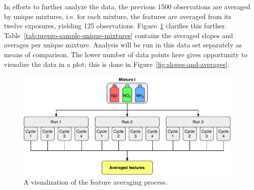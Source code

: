 In efforts to further analyze the data, the previous 1500 observations are averaged by unique mixtures, i.e. for each mixture, the features are averaged from its twelve exposures, yielding 125 observations. Figure~\ref{fig:averaging-process} clarifies this further. Table~\ref{tab:prepro-sample-unique-mixtures} contains the averaged slopes and averages per unique mixture. Analysis will be run in this data set separately as means of comparison. The lower number of data points here gives opportunity to visualize the data in a plot; this is done in Figure~\ref{fig:slopes-and-averages}.

\begin{figure}[h]
	\centering
	\includegraphics[width=1\textwidth]{../figures/averaging-process.pdf}
	\caption{A visualization of the feature averaging process.}
	\label{fig:averaging-process}
\end{figure}


